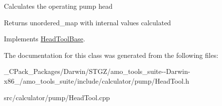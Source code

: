 Calculates the operating pump head \begin{DoxyReturn}{Returns}
unordered\+\_\+map with internal values calculated 
\end{DoxyReturn}


Implements \hyperlink{class_head_tool_base_ab8df8f908827ce45dc5e769ea0e10f0b}{Head\+Tool\+Base}.



The documentation for this class was generated from the following files\+:\begin{DoxyCompactItemize}
\item 
\+\_\+\+C\+Pack\+\_\+\+Packages/\+Darwin/\+S\+T\+G\+Z/amo\+\_\+tools\+\_\+suite-\/-\/\+Darwin-\/x86\+\_/amo\+\_\+tools\+\_\+suite/include/calculator/pump/Head\+Tool.\+h\item 
src/calculator/pump/Head\+Tool.\+cpp\end{DoxyCompactItemize}
